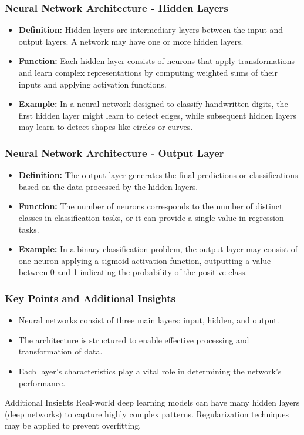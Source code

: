 \documentclass{beamer}
\begin{document}
\begin{frame}[fragile]
    \frametitle{Neural Network Architecture - Hidden Layers}
    \begin{itemize}
        \item \textbf{Definition:} Hidden layers are intermediary layers between the input and output layers. A network may have one or more hidden layers.
        \item \textbf{Function:} Each hidden layer consists of neurons that apply transformations and learn complex representations by computing weighted sums of their inputs and applying activation functions.
        \item \textbf{Example:} In a neural network designed to classify handwritten digits, the first hidden layer might learn to detect edges, while subsequent hidden layers may learn to detect shapes like circles or curves.
    \end{itemize}
\end{frame}

\begin{frame}[fragile]
    \frametitle{Neural Network Architecture - Output Layer}
    \begin{itemize}
        \item \textbf{Definition:} The output layer generates the final predictions or classifications based on the data processed by the hidden layers.
        \item \textbf{Function:} The number of neurons corresponds to the number of distinct classes in classification tasks, or it can provide a single value in regression tasks.
        \item \textbf{Example:} In a binary classification problem, the output layer may consist of one neuron applying a sigmoid activation function, outputting a value between 0 and 1 indicating the probability of the positive class.
    \end{itemize}
\end{frame}

\begin{frame}[fragile]
    \frametitle{Key Points and Additional Insights}
    \begin{itemize}
        \item Neural networks consist of three main layers: input, hidden, and output.
        \item The architecture is structured to enable effective processing and transformation of data.
        \item Each layer's characteristics play a vital role in determining the network's performance.
    \end{itemize}
    \begin{block}{Additional Insights}
        Real-world deep learning models can have many hidden layers (deep networks) to capture highly complex patterns. Regularization techniques may be applied to prevent overfitting.
    \end{block}
\end{frame}
\end{document}

